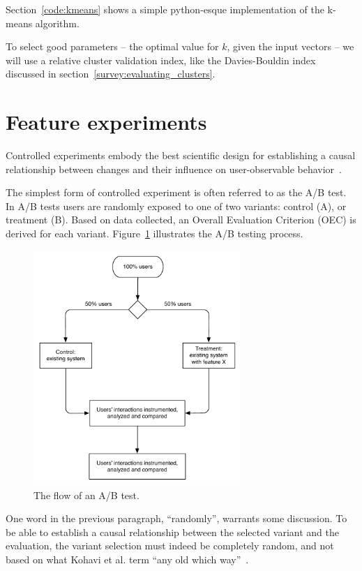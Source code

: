 Section~\ref{code:kmeans} shows a simple python-esque implementation of the k-means algorithm.

To select good parameters -- the optimal value for $k$, given the input vectors -- we will use a relative cluster validation index, like the Davies-Bouldin index discussed in section~\ref{survey:evaluating_clusters}.

\section{Feature experiments}
\label{approach:feature_experiments}

Controlled experiments embody the best scientific design for establishing a causal relationship between changes and their influence on user-observable behavior~\cite{Kohavi2007,Kohavi2008}.

The simplest form of controlled experiment is often referred to as the A/B test. In A/B tests users are randomly exposed to one of two variants: control (A), or treatment (B). Based on data collected, an Overall Evaluation Criterion (OEC) is derived for each variant. Figure~\ref{fig:ab_flow} illustrates the A/B testing process.

\begin{figure}[h]
  \centering
    \includegraphics[width=0.7\textwidth]{Figures/ab-test-flow}
    \caption{The flow of an A/B test.}
    \label{fig:ab_flow}
\end{figure}

One word in the previous paragraph, ``randomly'', warrants some discussion. To be able to establish a causal relationship between the selected variant and the evaluation, the variant selection must indeed be completely random, and not based on what Kohavi et al. term ``any old which way''~\cite{Kohavi2007}.


